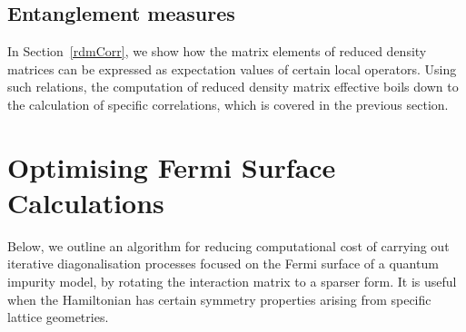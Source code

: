 \subsection{Entanglement measures}
In Section~\ref{rdmCorr}, we show how the matrix elements of reduced density matrices can be expressed as expectation values of certain local operators. Using such relations, the computation of reduced density matrix effective boils down to the calculation of specific correlations, which is covered in the previous section.


\section{Optimising Fermi Surface Calculations}
Below, we outline an algorithm for reducing computational cost of carrying out iterative diagonalisation processes focused on the Fermi surface of a quantum impurity model, by rotating the interaction matrix to a sparser form. It is useful when the Hamiltonian has certain symmetry properties arising from specific lattice geometries.

